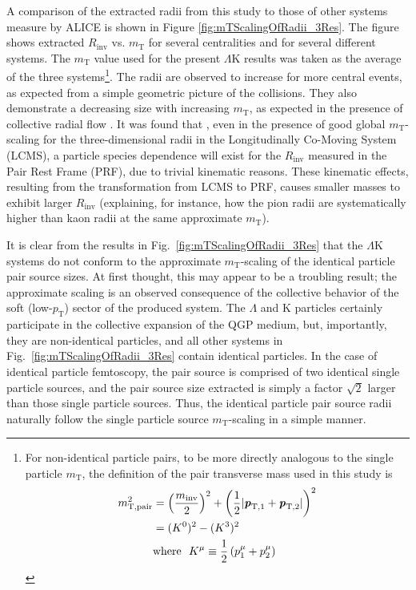 \documentclass[ALICE,manyauthors]{cernphprep}
\newcommand{\mt}{$m_{\mathrm{T}}$\xspace}
\newcommand{\pt}{$p_{\mathrm{T}}$\xspace}
\newcommand{\Lam}{$\Lambda$\xspace}
\newcommand{\LamK}{$\Lambda$K\xspace}
\begin{document}
A comparison of the extracted radii from this study to those of other systems measure by ALICE \cite{Adam:2015vja} is shown in Figure \ref{fig:mTScalingOfRadii_3Res}. 
The figure shows extracted $R_{\mathrm{inv}}$ vs. \mt for several centralities and for several different systems.
The \mt value used for the present \LamK results was taken as the average of the three systems\footnote[1]
{
For non-identical particle pairs, to be more directly analogous to the single particle \mt, the definition of the pair transverse mass used in this study is
\begin{equation*}
\begin{aligned}
 m_{\mathrm{T, pair}}^{2} &= \left( \frac{m_{\mathrm{inv}}}{2} \right)^{2} + \left( \frac{1}{2} |\textbf{\textit{p}}_{\mathrm{T,1}} + \textbf{\textit{p}}_{\mathrm{T,2}}| \right)^{2} \\
 &= (K^{0})^{2} - (K^{3})^{2} \\
 &\mathrm{where} ~~K^{\mu} \equiv \frac{1}{2} \left( p_{1}^{\mu} + p_{2}^{\mu} \right)
\end{aligned}
\label{eqn:PairmTv1}
\end{equation*}
}.
The radii are observed to increase for more central events, as expected from a simple geometric picture of the collisions.
They also demonstrate a decreasing size with increasing \mt, as expected in the presence of collective radial flow \cite{Akkelin:1995gh}.
It was found that \cite{Kisiel:2014upa}, even in the presence of good global \mt-scaling for the three-dimensional radii in the Longitudinally Co-Moving System (LCMS), a particle species dependence will exist for the $R_{\mathrm{inv}}$ measured in the Pair Rest Frame (PRF), due to trivial kinematic reasons.
These kinematic effects, resulting from the transformation from LCMS to PRF, causes smaller masses to exhibit larger $R_{\mathrm{inv}}$ \cite{Adam:2015vja} (explaining, for instance, how the pion radii are systematically higher than kaon radii at the same approximate \mt).


It is clear from the results in Fig.\ \ref{fig:mTScalingOfRadii_3Res} that the \LamK systems do not conform to the approximate \mt-scaling of the identical particle pair source sizes.
At first thought, this may appear to be a troubling result; the approximate scaling is an observed consequence of the collective behavior of the soft (low-\pt) sector of the produced system.
The \Lam and K particles certainly participate in the collective expansion of the QGP medium, but, importantly, they are non-identical particles, and all other systems in Fig.\ \ref{fig:mTScalingOfRadii_3Res} contain identical particles.
In the case of identical particle femtoscopy, the pair source is comprised of two identical single particle sources, and the pair source size extracted is simply a factor $\sqrt{2}$ larger than those single particle sources.
Thus, the identical particle pair source radii naturally follow the single particle source \mt-scaling in a simple manner.
\end{document}

